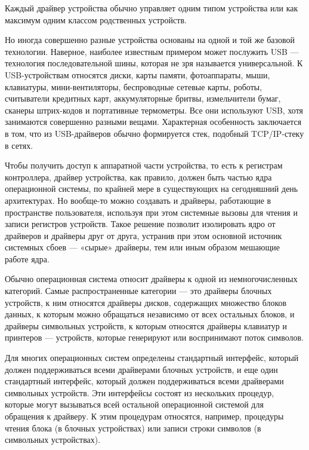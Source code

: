 Каждый драйвер устройства обычно управляет одним типом устройства или как максимум одним классом родственных устройств.

Но иногда совершенно разные устройства основаны на одной и той же базовой технологии. Наверное, наиболее известным примером может послужить USB — технология последовательной шины, которая не зря называется универсальной. К USB-устройствам относятся диски, карты памяти, фотоаппараты, мыши, клавиатуры, мини-вентиляторы, беспроводные сетевые карты, роботы, считыватели кредитных карт, аккумуляторные бритвы, измельчители бумаг, сканеры штрих-кодов и портативные термометры. Все они используют USB, хотя занимаются совершенно разными вещами. Характерная особенность заключается в том, что из USB-драйверов обычно формируется стек, подобный TCP/IP-стеку в сетях. 

Чтобы получить доступ к аппаратной части устройства, то есть к регистрам контроллера, драйвер устройства, как правило, должен быть частью ядра операционной системы, по крайней мере в существующих на сегодняшний день архитектурах. Но вообще-то можно создавать и драйверы, работающие в пространстве пользователя, используя при этом системные вызовы для чтения и записи регистров устройств. Такое решение позволит изолировать ядро от драйверов и драйверы друг от друга, устранив при этом основной источник системных сбоев — «сырые» драйверы, тем или иным образом мешающие работе ядра.

Обычно операционная система относит драйверы к одной из немногочисленных категорий. Самые распространенные категории — это драйверы блочных устройств, к ним относятся драйверы дисков, содержащих множество блоков данных, к которым можно обращаться независимо от всех остальных блоков, и драйверы символьных устройств, к которым относятся драйверы клавиатур и принтеров — устройств, которые генерируют или воспринимают поток символов.

Для многих операционных систем определены стандартный интерфейс, который должен поддерживаться всеми драйверами блочных устройств, и еще один стандартный интерфейс, который должен поддерживаться всеми драйверами символьных устройств. Эти интерфейсы состоят из нескольких процедур, которые могут вызываться всей остальной операционной системой для обращения к драйверу. К этим процедурам относятся, например, процедуры чтения блока (в блочных устройствах) или записи строки символов (в символьных устройствах).

